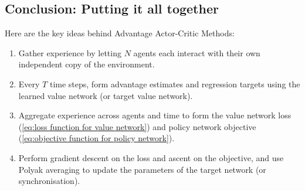 \documentclass[]{article}
\begin{document}
\subsection*{Conclusion: Putting it all together}
Here are the key ideas behind Advantage Actor-Critic Methods:
\begin{enumerate}
	\item Gather experience by letting $N$ agents each interact with their own independent copy of the environment. 
	\item Every $T$ time steps, form advantage estimates and regression targets using the learned value network (or target value network).
	\item Aggregate experience across agents and time to form the value network loss (\ref{eq:loss function for value network}) and policy network objective (\ref{eq:objective function for policy network}).
	\item Perform gradient descent on the loss and ascent on the objective, and use Polyak averaging to update the parameters of the target network (or synchronisation). 
\end{enumerate}
\end{document}
